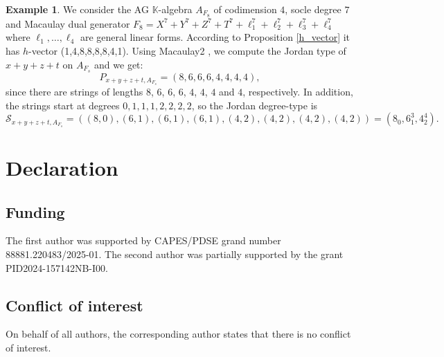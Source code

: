 \documentclass[12pt,twoside]{amsart}
\numberwithin{equation}{section} \hyphenation{semi-stable}
\newcommand{\K}{\mathbb{K}}
\theoremstyle{definition}
\newtheorem{example}[theorem]{Example}
\begin{document}
\begin{example} We consider the AG $\K$-algebra $A_{F_8}$ of codimension $4$, socle degree $7$ and Macaulay dual generator $F_8=X^7+Y^7+Z^7+T^7+\ell_1^7+\ell_2^7+\ell_3^7+\ell_4^7$ where $\ell_1,\ldots ,\ell_4$ are general linear forms. According to Proposition \ref{h_vector}
 it has $h$-vector (1,4,8,8,8,8,4,1).  Using Macaulay2  \cite{M2}, we compute the Jordan type of $x+y+z+t$ on $A_{F_s}$ and we get: 
$$
P_{x+y+z+t,A_{F_s}} = (8,6,6,6,4,4,4,4),
$$
since there are strings of  lengths $8$, $6$, $6$, $6$, $4$, $4$, $4$ and $4$, respectively. In addition, the strings start at degrees $0,1,1,1,2,2,2,2$, so the Jordan degree-type is
$$ 
\mathcal{S}_{x+y+z+t,A_{F_s}} = ((8,0),(6,1),(6,1),(6,1),(4,2),(4,2),(4,2),(4,2)) = (8_0, 6_1^3, 4_2^4) . 
$$ 


\end{example}

\section*{Declaration}

\subsection*{Funding} The first author was supported by CAPES/PDSE grand number 88881.220483/2025-01. The second author was partially supported
by the grant PID2024-157142NB-I00.
\subsection*{Conflict of interest} On behalf of all authors, the corresponding author states that there is no conflict of
interest.
\end{document}
